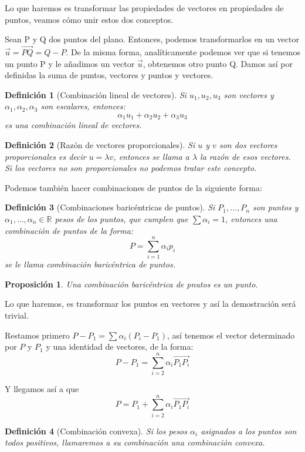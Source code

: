 \documentclass[11pt, a4paper, titlepage]{article}
\makeatletter
\renewenvironment{proof}[1][\proofname] {\vspace{-15pt}\par\pushQED{\qed}\normalfont\topsep6\p@\@plus6\p@\relax\trivlist\item[\hskip\labelsep\it#1\@addpunct{.}]\ignorespaces}{\popQED\endtrivlist\@endpefalse}
\newcommand{\R}{\mathbb{R}}
\theoremstyle{theorem-style}
\newtheorem*{nprop}{Proposición}
\theoremstyle{definition-style}
\newtheorem*{ndef}{Definición}
\theoremstyle{remark-style}
\theoremstyle{example-style}
\makeatother
\begin{document}
Lo que haremos es transformar las propiedades de vectores en propiedades de puntos, veamos cómo unir estos dos conceptos.

Sean P y Q dos puntos del plano. Entonces, podemos transformarlos en un vector $\vec{u} = \overrightarrow{PQ} = Q-P$. De la misma forma, analíticamente podemos ver que si tenemos un punto P y le añadimos un vector $\vec{u}$, obtenemos otro punto Q. Damos así por definidas la suma de puntos, vectores y puntos y vectores.

\begin{ndef}[Combinación lineal de vectores]
	Si $u_1,u_2,u_3$ son vectores y $\alpha_1,\alpha_2,\alpha_3$ son escalares, entonces:
	\[
	\alpha_1 u_1+ \alpha_2 u_2 + \alpha_3 u_3
	\]
	es una combinación lineal de vectores.
\end{ndef}

\begin{ndef}[Razón de vectores proporcionales]
	Si $u$ y $v$ son dos vectores proporcionales es decir $u = \lambda v$, entonces se llama a $\lambda$ la razón de esos vectores.
	Si los vectores no son proporcionales no podemos tratar este concepto.
\end{ndef}
Podemos también hacer combinaciones de puntos de la siguiente forma:
\begin{ndef}[Combinaciones baricéntricas de puntos]
	Si $P_1,...,P_n$ son puntos y $\alpha_1,...,\alpha_n \in \R$ pesos de los puntos, que cumplen que $\sum \alpha_i = 1$, entonces una combinación de puntos de la forma:
	\[
	P = \sum_{i=1}^n \alpha_i p_i
	\]
	se le llama combinación baricéntrica de puntos.
\end{ndef}
\begin{nprop} Una combinación baricéntrica de pnutos es un punto. 
\end{nprop}
\begin{proof}
	Lo que haremos, es transformar los puntos en vectores y así la demostración será trivial.

	Restamos primero $P-P_1 = \sum \alpha_i(P_i-P_1)$, así tenemos el vector determinado por $P$ y $P_1$ y una identidad de vectores, de la forma:
	\[
	P-P_1 = \sum_{i=2}^n \alpha_i \overrightarrow{P_1P_i}
	\]

	Y llegamos así a que
	\[
	P = P_1 + \sum_{i=2}^n \alpha_i \overrightarrow{P_1P_i}
	\]
\end{proof}

\begin{ndef}[Combinación convexa]
	Si los pesos $\alpha_i$ asignados a los puntos son todos positivos, llamaremos a su combinación una combinación convexa.
\end{ndef}
\end{document}
